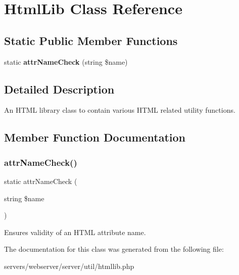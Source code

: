 \section{Html\+Lib Class Reference}
\label{class_html_1_1_html_lib}
\subsection*{Static Public Member Functions}
\begin{DoxyCompactItemize}
\item 
static \textbf{ attr\+Name\+Check} (string \$name)
\end{DoxyCompactItemize}


\subsection{Detailed Description}
An H\+T\+ML library class to contain various H\+T\+ML related utility functions. 

\subsection{Member Function Documentation}
\mbox{\label{class_html_1_1_html_lib_a53ec3d81bbf119ac8be017abed712c32}} 
\subsubsection{attr\+Name\+Check()}
{\footnotesize\ttfamily static attr\+Name\+Check (\begin{DoxyParamCaption}\item[{string}]{\$name }\end{DoxyParamCaption})\hspace{0.3cm}{\ttfamily [static]}}

Ensures validity of an H\+T\+ML attribute name. 


The documentation for this class was generated from the following file\+:\begin{DoxyCompactItemize}
\item 
servers/webserver/server/util/htmllib.\+php\end{DoxyCompactItemize}
